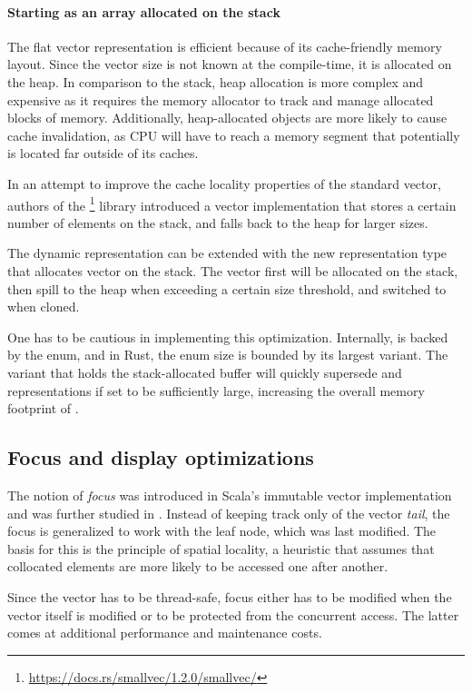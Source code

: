 \paragraph{Starting as an array allocated on the stack}
The flat vector representation is efficient because of its cache-friendly memory layout. Since the vector size is not known at the compile-time, it is allocated on the heap. In comparison to the stack, heap allocation is more complex and expensive as it requires the memory allocator to track and manage allocated blocks of memory. Additionally, heap-allocated objects are more likely to cause cache invalidation, as CPU will have to reach a memory segment that potentially is located far outside of its caches.

In an attempt to improve the cache locality properties of the standard vector, authors of the \footnote{\url{https://docs.rs/smallvec/1.2.0/smallvec/}} library introduced a vector implementation that stores a certain number of elements on the stack, and falls back to the heap for larger sizes.

The dynamic representation can be extended with the new representation type that allocates vector on the stack. The vector first will be allocated on the stack, then spill to the heap when exceeding a certain size threshold, and switched to \rrbvec{} when cloned.

One has to be cautious in implementing this optimization. Internally, \pvec{} is backed by the  enum, and in Rust, the enum size is bounded by its largest variant. The variant that holds the stack-allocated buffer will quickly supersede  and  representations if set to be sufficiently large, increasing the overall memory footprint of \pvec{}.

\subsection{Focus and display optimizations}
The notion of \emph{focus} was introduced in Scala's immutable vector implementation and was further studied in \cite{rrb-vector-practical-general-purpose-im-sequence}. Instead of keeping track only of the vector \emph{tail}, the focus is generalized to work with the leaf node, which was last modified. The basis for this is the principle of spatial locality, a heuristic that assumes that collocated elements are more likely to be accessed one after another.

Since the vector has to be thread-safe, focus either has to be modified when the vector itself is modified or to be protected from the concurrent access. The latter comes at additional performance and maintenance costs.

